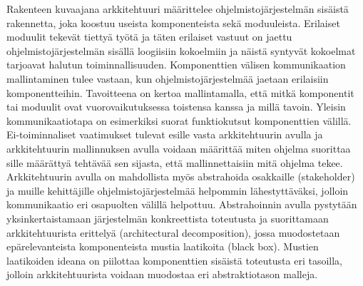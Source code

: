 \documentclass[finnish]{tktltiki2}
\theoremstyle{definition}
\theoremstyle{remark}
\begin{document}
Rakenteen kuvaajana arkkitehtuuri määrittelee ohjelmistojärjestelmän sisäistä rakennetta, joka koostuu useista komponenteista sekä moduuleista. Erilaiset moduulit tekevät tiettyä työtä ja täten erilaiset vastuut on jaettu ohjelmistojärjestelmän sisällä loogiisiin kokoelmiin ja näistä syntyvät kokoelmat tarjoavat halutun toiminnallisuuden.
Komponenttien välisen kommunikaation mallintaminen tulee vastaan, kun ohjelmistojärjestelmää jaetaan erilaisiin komponentteihin. Tavoitteena on kertoa mallintamalla, että mitkä komponentit tai moduulit ovat vuorovaikutuksessa toistensa kanssa ja millä tavoin. Yleisin kommunikaatiotapa on esimerkiksi suorat funktiokutsut komponenttien välillä.  
Ei-toiminnaliset vaatimukset tulevat esille vasta arkkitehtuurin avulla ja arkkitehtuurin mallinnuksen avulla voidaan määrittää miten ohjelma suorittaa sille määrättyä tehtävää sen sijasta, että mallinnettaisiin mitä ohjelma tekee. 
Arkkitehtuurin avulla on mahdollista myös abstrahoida %
osakkaille (stakeholder) ja muille kehittäjille ohjelmistojärjestelmää helpommin lähestyttäväksi, jolloin kommunikaatio eri osapuolten välillä helpottuu. Abstrahoinnin avulla pystytään yksinkertaistamaan järjestelmän konkreettista toteutusta ja suorittamaan arkkitehtuurista erittelyä (architectural decomposition), jossa muodostetaan epärelevanteista komponenteista mustia laatikoita (black box). Mustien laatikoiden ideana on piilottaa komponenttien sisäistä toteutusta eri tasoilla, jolloin arkkitehtuurista voidaan muodostaa eri abstraktiotason malleja.
\end{document}
